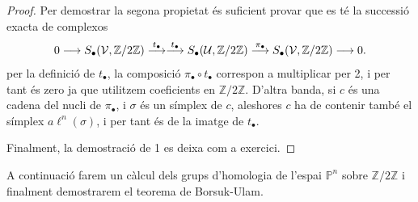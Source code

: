\documentclass[../main.tex]{subfiles}
\begin{document}
\begin{proof}
Per demostrar la segona propietat és suficient provar que es té la successió exacta de complexos
\begin{equation}
    \notag
    0\longrightarrow S_\bullet(\mathcal{V},\mathbb{Z}/2\mathbb{Z})\overset{t_\bullet}{\longrightarrow}\overset{t_\bullet}{\longrightarrow}S_\bullet(\mathcal{U},\mathbb{Z}/2\mathbb{Z})\overset{\pi_\bullet}{\longrightarrow}S_\bullet(\mathcal{V},\mathbb{Z}/2\mathbb{Z})\longrightarrow 0.
\end{equation}
per la definició de $t_\bullet$, la composició $\pi_\bullet\circ t_\bullet$ correspon a multiplicar per 2, i per tant és zero ja que utilitzem coeficients en $\mathbb{Z}/2\mathbb{Z}$. D'altra banda, si $c$ és una cadena del nucli de $\pi_\bullet$, i $\sigma$ és un símplex de $c$, aleshores $c$ ha de contenir també el símplex $a\ell^n(\sigma)$, i per tant és de la imatge de $t_\bullet$. 

Finalment, la demostració de 1 es deixa com a exercici.
\end{proof}

A continuació farem un càlcul dels grups d'homologia de l'espai $\mathbb{P}^n$ sobre $\mathbb{Z}/2\mathbb{Z}$ i finalment demostrarem el teorema de Borsuk-Ulam.
\end{document}
